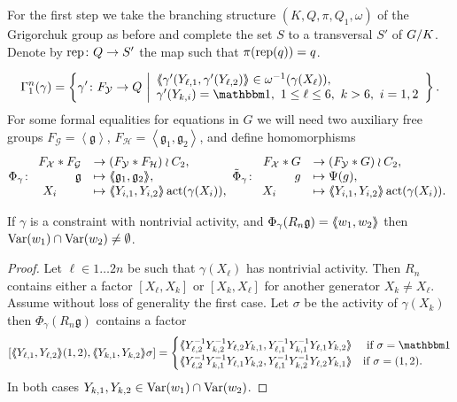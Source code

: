 \documentclass[a4paper,11pt]{amsart}
\begin{document}
For the first step we take the branching structure $(K,Q,\pi,Q_1,\omega)$
of the Grigorchuk group as before and complete the set $S$ to a
transversal $S'$ of ${G/K}$. Denote by $\operatorname{rep}\colon Q\to S'$ the
map such that $\pi(\operatorname{rep}(q)) = q$.
 
\[\Gamma_1^n(\gamma) = \left \{\gamma' 
    \colon F_{\mathcal Y} \to Q \bigmid
    \begin{array}{l}
      \pair{\gamma'(Y_{\ell,1},\gamma'(Y_{\ell,2})}\in \omega^{-1}(\gamma
      (X_\ell)), \\
      \gamma'(Y_{k,i}) = \id,\ 1\leq \ell \leq 6,\ k>6,\ i=1,2
    \end{array} \right\}.\]
For some formal equalities for equations in $G$ we will need two auxiliary free
groups $F_{\mathcal{G}}=\left<\mathfrak{g}\right>$,
$F_{\mathcal{H}}=\left<\mathfrak{g}_1,\mathfrak{g}_2\right>$, and define  homomorphisms  
\[\Phi_{\gamma}\colon
\begin{array}{rl}
 F_{\mathcal{X}}*F_{\mathcal G} &\to (F_{\mathcal{Y}}*F_{\mathcal{H}})\wr C_2,\\
  \mathfrak g   &\mapsto \langle\negthickspace\langle\mathfrak g_1, \mathfrak g_2\rangle\negthickspace\rangle,\\ 
  X_i\qquad &\mapsto \langle\negthickspace\langle Y_{i,1},Y_{i,2}\rangle\negthickspace\rangle\operatorname{act}(\gamma(X_i)),
 \end{array}
\tilde\Phi_{\gamma}\colon
\begin{array}{rl}
 F_{\mathcal{X}}*G &\to (F_{\mathcal{Y}}*G)\wr C_2,\\
   g   &\mapsto \Psi(g),\\ 
  X_i\qquad &\mapsto \langle\negthickspace\langle Y_{i,1},Y_{i,2}\rangle\negthickspace\rangle\operatorname{act}(\gamma(X_i)).
 \end{array}
 \]
\begin{lem}\label{lem:commonVar}
  If $\gamma$ is a constraint with nontrivial activity, and
  $\Phi_\gamma(R_n\mathfrak g)=\langle\negthickspace\langle w_1,w_2\rangle\negthickspace\rangle$ then
  $\textup{Var}(w_1)\cap\textup{Var}(w_2)\neq \emptyset$.
\end{lem}
\begin{proof}
  Let $\ell\in 1\ldots 2n$ be such that $\gamma(X_\ell)$ has
  nontrivial activity. Then $R_n$ contains either a factor $[X_\ell,X_k]$ or
  $[X_k,X_\ell]$ for another generator $X_k\neq X_\ell$.  Assume without loss of
  generality the first case. Let $\sigma$ be the activity of $\gamma(X_k)$
  then $\Phi_\gamma(R_n \mathfrak g)$
  contains a factor
  \[ [\pair{Y_{\ell,1},Y_{\ell,2}}(1,2),\pair{Y_{k,1},Y_{k,2}}\sigma] = 
  \begin{cases}
      \pair{Y_{\ell,2}^{-1}Y_{k,2}^{-1}Y_{\ell,2}Y_{k,1},Y_{\ell,1}^{-1}Y_{k,1}^
      {-1}Y_{\ell,1}Y_{k,2}} & \textup{ if } \sigma=\id \\
      \pair{Y_{\ell,2}^{-1}Y_{k,1}^{-1}Y_{\ell,1}Y_{k,2},Y_{\ell,1}^{-1}Y_{k,2}^
      {-1}Y_{\ell,2}Y_{k,1}} & \textup{if } \sigma=(1,2) . \\
    \end{cases}
  \]
  In both cases $Y_{k,1},Y_{k,2}\in \textup{Var}(w_1)\cap \textup{Var}(w_2)$.
\end{proof}
\end{document}
